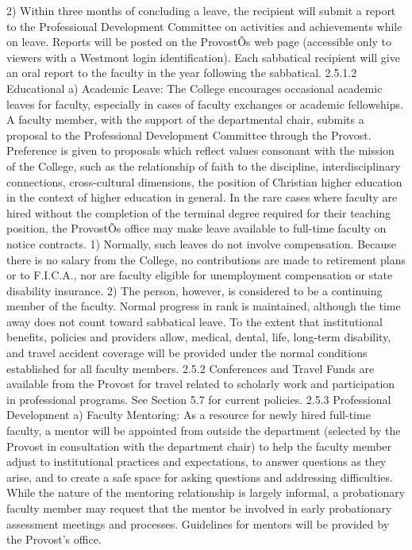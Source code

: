 \documentclass[letterpaper, 11pt]{article}
\begin{document}
	2) Within three months of concluding a leave, the recipient will submit a report to the Professional Development Committee on activities and achievements while on leave.  Reports will be posted on the ProvostÕs web page (accessible only to viewers with a Westmont login identification).  Each sabbatical recipient will give an oral report to the faculty in the year following the sabbatical.
	2.5.1.2 Educational
	a) Academic Leave:  The College encourages occasional academic leaves for faculty, especially in cases of faculty exchanges or academic fellowships.  A faculty member, with the support of the departmental chair, submits a proposal to the Professional Development Committee through the Provost.  Preference is given to proposals which reflect values consonant with the mission of the College, such as the relationship of faith to the discipline, interdisciplinary connections, cross-cultural dimensions, the position of Christian higher education in the context of higher education in general.  In the rare cases where faculty are hired without the completion of the terminal degree required for their teaching position, the ProvostÕs office may make leave available to full-time faculty on notice contracts.
	1) Normally, such leaves do not involve compensation.  Because there is no salary from the College, no contributions are made to retirement plans or to F.I.C.A., nor are faculty eligible for unemployment compensation or state disability insurance.
	2) The person, however, is considered to be a continuing member of the faculty. Normal progress in rank is maintained, although the time away does not count toward sabbatical leave.  To the extent that institutional benefits, policies and providers allow, medical, dental, life, long-term disability, and travel accident coverage will be provided under the normal conditions established for all faculty members.
	2.5.2 Conferences and Travel
	Funds are available from the Provost for travel related to scholarly work and participation in professional programs.  See Section 5.7 for current policies.
	2.5.3 Professional Development
	a) Faculty Mentoring:  As a resource for newly hired full-time faculty, a mentor will be appointed from outside the department (selected by the Provost in consultation with the department chair) to help the faculty member adjust to institutional practices and expectations, to answer questions as they arise, and to create a safe space for asking questions and addressing difficulties.  While the nature of the mentoring relationship is largely informal, a probationary faculty member may request that the mentor be involved in early probationary assessment meetings and processes.  Guidelines for mentors will be provided by the Provost's office.
\end{document}
